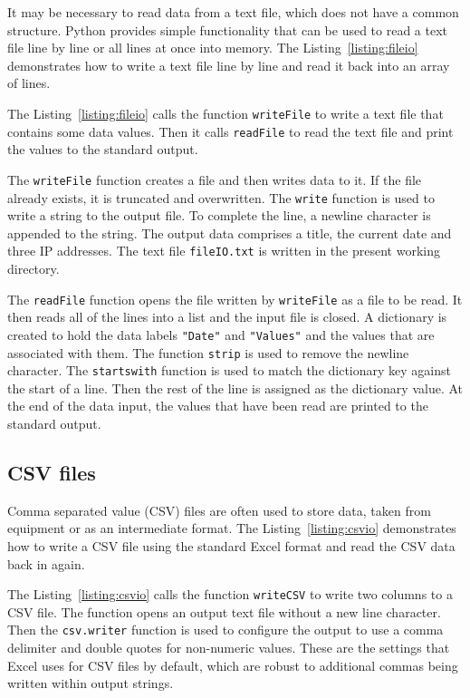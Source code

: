 \documentclass[11pt,a4paper]{article}
\begin{document}
It may be necessary to read data from a text file, which does not have a common structure.  Python provides simple functionality that can be used to read a text file line by line or all lines at once into memory.  The Listing~\ref{listing:fileio} demonstrates how to write a text file line by line and read it back into an array of lines.



The Listing~\ref{listing:fileio} calls the function \texttt{writeFile} to write a text file that contains some data values.  Then it calls \texttt{readFile} to read the text file and print the values to the standard output.

The \texttt{writeFile} function creates a file and then writes data to it.  If the file already exists, it is truncated and overwritten.  The \texttt{write} function is used to write a string to the output file.  To complete the line, a newline character is appended to the string.  The output data comprises a title, the current date and three IP addresses.  The text file \texttt{fileIO.txt} is written in the present working directory.

The \texttt{readFile} function opens the file written by \texttt{writeFile} as a file to be read.  It then reads all of the lines into a list and the input file is closed.  A dictionary is created to hold the data labels \texttt{"Date"} and \texttt{"Values"} and the values that are associated with them.  The function \texttt{strip} is used to remove the newline character.  The \texttt{startswith} function is used to match the dictionary key against the start of a line.  Then the rest of the line is assigned as the dictionary value.  At the end of the data input, the values that have been read are printed to the standard output.

\subsection{CSV files}

Comma separated value (CSV) files are often used to store data, taken from equipment or as an intermediate format.  The Listing~\ref{listing:csvio} demonstrates how to write a CSV file using the standard Excel format and read the CSV data back in again.



The Listing~\ref{listing:csvio} calls the function \texttt{writeCSV} to write two columns to a CSV file.  The function opens an output text file without a new line character.  Then the \texttt{csv.writer} function is used to configure the output to use a comma delimiter and double quotes for non-numeric values.  These are the settings that Excel uses for CSV files by default, which are robust to additional commas being written within output strings.
\end{document}
